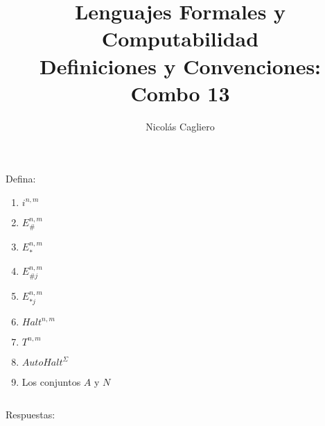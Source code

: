 \documentclass{article}
\title{Lenguajes Formales y Computabilidad \\
        \large Definiciones y Convenciones: Combo 13 }
\author{Nicolás Cagliero}
\begin{document}
\maketitle

Defina:

\begin{enumerate}
    \item $i^{n, m}$
    \item $E_{\#}^{n, m}$
    \item $E_{*}^{n, m}$
    \item $E_{\#j}^{n, m}$
    \item $E_{*j}^{n, m}$
    \item $Halt^{n, m}$
    \item $T^{n, m}$
    \item $AutoHalt^{\Sigma}$
    \item Los conjuntos $A$ y $N$
\end{enumerate}

\(\)
\begin{center}
    Respuestas: 
    \(\)
\end{center}
\end{document}
